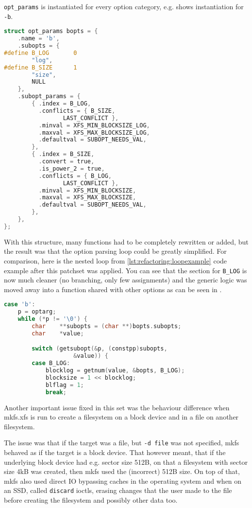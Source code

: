 {\tt opt\_params} is instantiated for every option category, e.g.
 shows instantiation for {\tt
-b}.

\begin{lstlisting}[frame=none, basicstyle=\footnotesize\ttfamily,
language=C, numbers=none, numberstyle=\tiny\color{black},
caption= {Instantiation of the table for block options.},
label={lst:refactoring:instantiation}]
struct opt_params bopts = {
	.name = 'b',
	.subopts = {
#define	B_LOG		0
		"log",
#define	B_SIZE		1
		"size",
		NULL
	},
	.subopt_params = {
		{ .index = B_LOG,
		  .conflicts = { B_SIZE,
				 LAST_CONFLICT },
		  .minval = XFS_MIN_BLOCKSIZE_LOG,
		  .maxval = XFS_MAX_BLOCKSIZE_LOG,
		  .defaultval = SUBOPT_NEEDS_VAL,
		},
		{ .index = B_SIZE,
		  .convert = true,
		  .is_power_2 = true,
		  .conflicts = { B_LOG,
				 LAST_CONFLICT },
		  .minval = XFS_MIN_BLOCKSIZE,
		  .maxval = XFS_MAX_BLOCKSIZE,
		  .defaultval = SUBOPT_NEEDS_VAL,
		},
	},
};
\end{lstlisting}

With this structure, many functions had to be completely rewritten or
added, but the result was that the option parsing loop could be greatly
simplified. For comparison, here is the nested loop from
\ref{lst:refactoring:loopexample} code example after this patchset was
applied. You can see that the section for {\tt B\_LOG} is now much cleaner
(no branching, only few assignments) and the generic logic was moved away
into a function shared with other options as can be seen in
.

\begin{lstlisting}[frame=none, basicstyle=\footnotesize\ttfamily,
language=C, numbers=none, numberstyle=\tiny\color{black},
caption= {Part of option-parsing loop from mkfs.xfs after the first patch
set.},
label={lst:refactoring:parsingAfterFirst}]
case 'b':
	p = optarg;
	while (*p != '\0') {
		char	**subopts = (char **)bopts.subopts;
		char	*value;

		switch (getsubopt(&p, (constpp)subopts,
					&value)) {
		case B_LOG:
			blocklog = getnum(value, &bopts, B_LOG);
			blocksize = 1 << blocklog;
			blflag = 1;
			break;
\end{lstlisting}

Another important issue fixed in this set was the behaviour difference when
mkfs.xfs is run to create a filesystem on a block device and in a file on
another filesystem.

The issue was that if the target was a file, but {\tt -d file} was not
specified, mkfs behaved as if the target is a block device. That however
meant, that if the underlying block device had e.g. sector size 512B, on
that a filesystem with sector size 4kB was created, then mkfs used the
(incorrect) 512B size. On top of that, mkfs also used direct IO bypassing
caches in the operating system and when on an SSD, called {\tt discard}
ioctls, erasing changes that the user made to the file before
creating the filesystem and possibly other data too.

